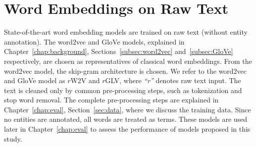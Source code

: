 \section{Word Embeddings on Raw Text}\label{sec:raw}
State-of-the-art word embedding models are trained on raw text (without entity annotation). The word2vec and GloVe models, explained in Chapter~\ref{chap:background}, Sections~\ref{subsec:word2vec} and~\ref{subsec:GloVe} respectively, are chosen as representatives of classical word embeddings. From the word2vec model, the skip-gram architecture is chosen. We refer to the word2vec and GloVe model as $r$W2V and  $r$GLV, where \emph{``r''} denotes raw text input. The text is cleaned only by common pre-processing steps, such as tokenization and stop word removal. The complete pre-processing steps are explained in Chapter~\ref{chap:eval}, Section~\ref{sec:data}, where we discuss the training data. 
Since no entities are annotated, all words are treated as terms. These models are used later in Chapter~\ref{chap:eval} to assess the performance of models proposed in this study. 

